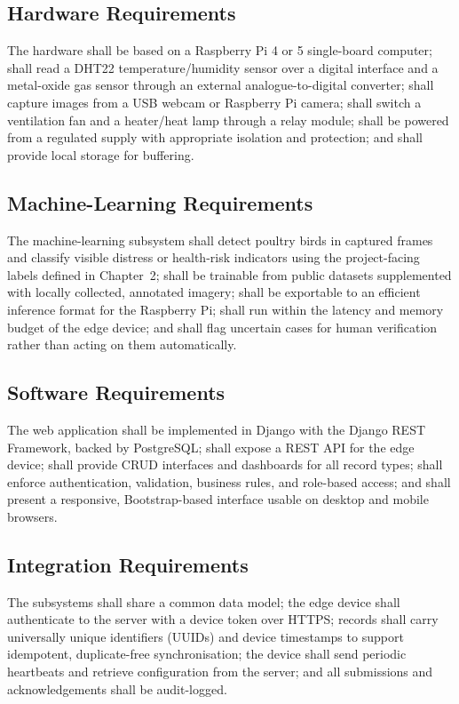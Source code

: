 \documentclass[12pt,a4paper]{report}
\begin{document}
\subsection{Hardware Requirements}

The hardware shall be based on a Raspberry Pi 4 or 5 single-board computer; shall read a DHT22 temperature/humidity sensor over a digital interface and a metal-oxide gas sensor through an external analogue-to-digital converter; shall capture images from a USB webcam or Raspberry Pi camera; shall switch a ventilation fan and a heater/heat lamp through a relay module; shall be powered from a regulated supply with appropriate isolation and protection; and shall provide local storage for buffering.

\subsection{Machine-Learning Requirements}

The machine-learning subsystem shall detect poultry birds in captured frames and classify visible distress or health-risk indicators using the project-facing labels defined in Chapter~2; shall be trainable from public datasets supplemented with locally collected, annotated imagery; shall be exportable to an efficient inference format for the Raspberry Pi; shall run within the latency and memory budget of the edge device; and shall flag uncertain cases for human verification rather than acting on them automatically.

\subsection{Software Requirements}

The web application shall be implemented in Django with the Django REST Framework, backed by PostgreSQL; shall expose a REST API for the edge device; shall provide CRUD interfaces and dashboards for all record types; shall enforce authentication, validation, business rules, and role-based access; and shall present a responsive, Bootstrap-based interface usable on desktop and mobile browsers.

\subsection{Integration Requirements}

The subsystems shall share a common data model; the edge device shall authenticate to the server with a device token over HTTPS; records shall carry universally unique identifiers (UUIDs) and device timestamps to support idempotent, duplicate-free synchronisation; the device shall send periodic heartbeats and retrieve configuration from the server; and all submissions and acknowledgements shall be audit-logged.
\end{document}
